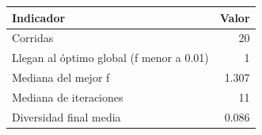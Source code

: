 \begin{tabular}{lr}
\toprule
Indicador & Valor \\
\midrule
Corridas & 20 \\
Llegan al óptimo global (f menor a 0.01) & 1 \\
Mediana del mejor f & 1.307 \\
Mediana de iteraciones & 11 \\
Diversidad final media & 0.086 \\
\bottomrule
\end{tabular}
